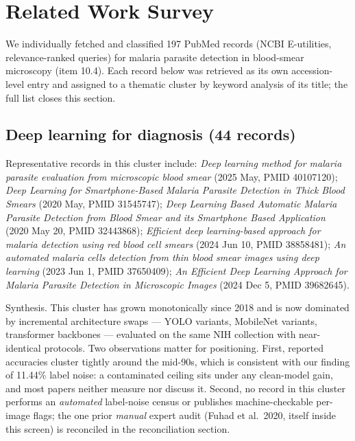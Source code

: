 \section{Related Work Survey}

We individually fetched and classified 197 PubMed records (NCBI E-utilities, relevance-ranked queries) for malaria parasite detection in blood-smear microscopy (item 10.4). Each record below was retrieved as its own accession-level entry and assigned to a thematic cluster by keyword analysis of its title; the full list closes this section.\par

\subsection*{Deep learning for diagnosis (44 records)}
Representative records in this cluster include: \emph{Deep learning method for malaria parasite evaluation from microscopic blood smear} (2025 May, PMID 40107120); \emph{Deep Learning for Smartphone-Based Malaria Parasite Detection in Thick Blood Smears} (2020 May, PMID 31545747); \emph{Deep Learning Based Automatic Malaria Parasite Detection from Blood Smear and its Smartphone Based Application} (2020 May 20, PMID 32443868); \emph{Efficient deep learning-based approach for malaria detection using red blood cell smears} (2024 Jun 10, PMID 38858481); \emph{An automated malaria cells detection from thin blood smear images using deep learning} (2023 Jun 1, PMID 37650409); \emph{An Efficient Deep Learning Approach for Malaria Parasite Detection in Microscopic Images} (2024 Dec 5, PMID 39682645).\par

Synthesis. This cluster has grown monotonically since 2018 and is now dominated by incremental architecture swaps --- YOLO variants, MobileNet variants, transformer backbones --- evaluated on the same NIH collection with near-identical protocols. Two observations matter for positioning. First, reported accuracies cluster tightly around the mid-90s, which is consistent with our finding of 11.44\% label noise: a contaminated ceiling sits under any clean-model gain, and most papers neither measure nor discuss it. Second, no record in this cluster performs an \emph{automated} label-noise census or publishes machine-checkable per-image flags; the one prior \emph{manual} expert audit (Fuhad et al.\ 2020, itself inside this screen) is reconciled in the reconciliation section.



